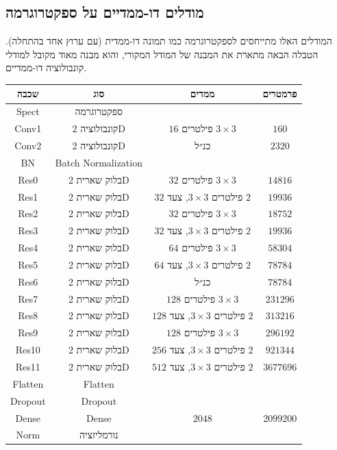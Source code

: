 \documentclass[hebrew, a4paper]{article}
\theoremstyle{plain}
\theoremstyle{definition}
\numberwithin{equation}{section}
\begin{document}
\subsection{מודלים דו-ממדיים על ספקטרוגרמה}
\label{sec:architecture-spect2d}

המודלים האלו מתייחסים לספקטרוגרמה כמו תמונה דו-ממדית (עם ערוץ אחד
בהתחלה). הטבלה הבאה מתארת את המבנה של המודל המקורי, והוא מבנה מאוד
מקובל למודלי קונבולוציה דו-ממדיים.

\begin{center}
  \begin{tabular}{cccc}
    שכבה & סוג & ממדים & פרמטרים \\\hline
    Spect & ספקטרוגרמה & & \\
    Conv1 & קונבולוציה 2D & $16$ פילטרים $3\times3$ & $\num{160}$ \\
    Conv2 & קונבולוציה 2D & כנ״ל & $\num{2320}$ \\
    BN & Batch Normalization & & \\
    Res0 & בלוק שארית 2D & $32$ פילטרים $3\times3$ & $\num{14816}$ \\
    Res1 & בלוק שארית 2D & $32$ פילטרים $3\times3$, צעד $2$ & $\num{19936}$ \\
    Res2 & בלוק שארית 2D & $32$ פילטרים $3\times3$ & $\num{18752}$ \\
    Res3 & בלוק שארית 2D & $32$ פילטרים $3\times3$, צעד $2$ & $\num{19936}$ \\
    Res4 & בלוק שארית 2D & $64$ פילטרים $3\times3$ & $\num{58304}$ \\
    Res5 & בלוק שארית 2D & $64$ פילטרים $3\times3$, צעד $2$ & $\num{78784}$ \\
    Res6 & בלוק שארית 2D & כנ״ל & $\num{78784}$ \\
    Res7 & בלוק שארית 2D & $128$ פילטרים $3\times3$ & $\num{231296}$ \\
    Res8 & בלוק שארית 2D & $128$ פילטרים $3\times3$, צעד $2$ & $\num{313216}$ \\
    Res9 & בלוק שארית 2D & $128$ פילטרים $3\times3$ & $\num{296192}$ \\
    Res10 & בלוק שארית 2D & $256$ פילטרים $3\times3$, צעד $2$ & $\num{921344}$ \\
    Res11 & בלוק שארית 2D & $512$ פילטרים $3\times3$, צעד $2$ & $\num{3677696}$ \\
    Flatten & Flatten & & \\
    Dropout & Dropout & & \\
    Dense & Dense & $2048$ & $\num{2099200}$ \\
    Norm & נורמליזציה & &
  \end{tabular}
\end{center}
\end{document}
